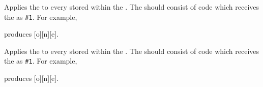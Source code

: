 \documentclass[oneside]{book}
\begin{document}
%

\begin{function}{\TlMapInline}
\begin{syntax}
  
\end{syntax}
Applies the  to every  stored within the
. The   should consist of code which
receives the  as \verb|#1|. For example,
\begin{codehigh}
\IgnoreSpacesOn
\TlClear \lTmpaTl
{} {
  \TlPutRight \lTmpaTl {[#1]}
}
\Result{\TlUse\lTmpaTl}
\IgnoreSpacesOff
\end{codehigh}
produces [o][n][e].
\end{function}

\begin{function}{\TlVarMapInline}
\begin{syntax}
  
\end{syntax}
Applies the  to every  stored within the
. The  should consist of code which
receives the  as \verb|#1|. For example,
\begin{codehigh}
\IgnoreSpacesOn
\TlClear \lTmpaTl
\TlSet {}
\TlVarMapInline \lTmpkTl {
  \TlPutRight \lTmpaTl {[#1]}
}
\Result{\TlUse\lTmpaTl}
\IgnoreSpacesOff
\end{codehigh}
produces [o][n][e].
\end{function}
\end{document}
